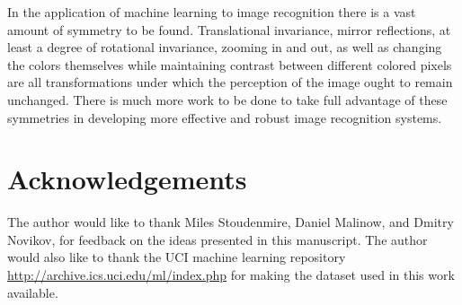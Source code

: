 \documentclass[twocolumn, prl, nofootinbib]{revtex4-1}
\begin{document}
In the application of machine learning to image recognition there is a vast amount of symmetry to be found. Translational invariance, mirror reflections, at least a degree of rotational invariance, zooming in and out, as well as changing the colors themselves while maintaining contrast between different colored pixels are all transformations under which the perception of the image ought to remain unchanged. There is much more work to be done to take full advantage of these symmetries in developing more effective and robust image recognition systems.


\section{Acknowledgements}

The author would like to thank Miles Stoudenmire, Daniel Malinow, and Dmitry Novikov, for feedback on the ideas presented in this manuscript. The author would also like to thank the UCI machine learning repository \url{http://archive.ics.uci.edu/ml/index.php} for making the dataset used in this work available.

\vskip -0.2in

%


%



\vskip 0.2in
\end{document}
